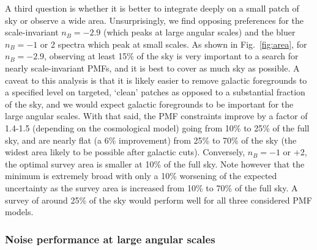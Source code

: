 \documentclass[apj]{emulateapj}
\begin{document}
A third question is whether it is better to integrate deeply on a small patch of sky or observe a wide area. 
Unsurprisingly, we find opposing preferences for the scale-invariant $n_B=-2.9$ (which peaks at large angular scales) and the bluer $n_B=-1$ or 2 spectra which peak at small scales. 
As shown in  Fig.~\ref{fig:area}, for $n_B=-2.9$, observing at least 15\% of the sky is very important to a search for nearly scale-invariant PMFs, and it is best  to cover as much sky as possible. 
A caveat to this analysis is that it is likely easier to remove galactic foregrounds to a specified level on targeted, `clean' patches as opposed to a substantial fraction of the sky, and we would expect galactic foregrounds to be important for the large angular scales. 
With that said, the PMF constraints improve by a factor of 1.4-1.5 (depending on the cosmological model) going from 10\% to 25\% of the full sky, and are nearly flat (a 6\% improvement) from 25\% to 70\% of the sky (the widest area likely to be possible after galactic cuts).
Conversely, $n_B=-1$ or +2, the optimal survey area is smaller at 10\% of the full sky. 
Note however that the minimum is extremely broad with only a 10\% worsening of the expected uncertainty as the survey area is increased from 10\% to 70\% of the  full sky. 
A survey of around 25\% of the sky would perform well for all three considered PMF models. 

\subsubsection{Noise performance at large angular scales}
\end{document}
